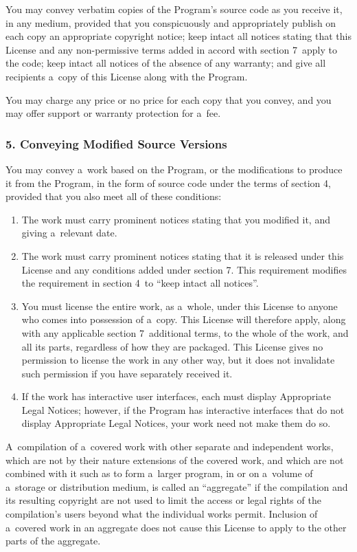 \documentclass[a4paper, 11pt, twoside]{article}
\begin{document}
You may convey verbatim copies of the Program's source code as you receive it, in any medium, provided that you conspicuously and appropriately publish on each copy an appropriate copyright notice; keep intact all notices stating that this License and any non-permissive terms added in accord with section 7~apply to the code; keep intact all notices of the absence of any warranty; and give all recipients a~copy of this License along with the Program.

You may charge any price or no price for each copy that you convey, and you may offer support or warranty protection for a~fee.

\subsubsection{5. Conveying Modified Source Versions}

You may convey a~work based on the Program, or the modifications to produce it from the Program, in the form of source code under the terms of section 4, provided that you also meet all of these conditions:

\begin{enumerate}[label=\Alph*)]
\item The work must carry prominent notices stating that you modified it, and giving a~relevant date.
\item The work must carry prominent notices stating that it is released under this License and any conditions added under section 7. This requirement modifies the requirement in section 4~to “keep intact all notices”.
\item You must license the entire work, as a~whole, under this License to anyone who comes into possession of a~copy. This License will therefore apply, along with any applicable section 7~additional terms, to the whole of the work, and all its parts, regardless of how they are packaged. This License gives no permission to license the work in any other way, but it does not invalidate such permission if you have separately received it.
\item If the work has interactive user interfaces, each must display Appropriate Legal Notices; however, if the Program has interactive interfaces that do not display Appropriate Legal Notices, your work need not make them do so.
\end{enumerate}

A~compilation of a~covered work with other separate and independent works, which are not by their nature extensions of the covered work, and which are not combined with it such as to form a~larger program, in or on a~volume of a~storage or distribution medium, is called an “aggregate” if the compilation and its resulting copyright are not used to limit the access or legal rights of the compilation's users beyond what the individual works permit. Inclusion of a~covered work in an aggregate does not cause this License to apply to the other parts of the aggregate.
\end{document}
